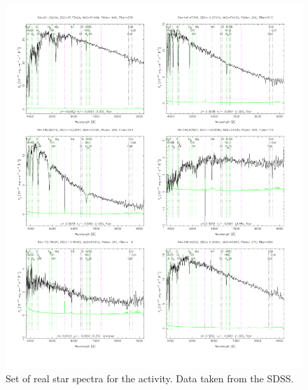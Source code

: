 \documentclass{tufte-handout}
\begin{document}
\begin{fullwidth}
\begin{figure}
  \includegraphics[width=2.0\columnwidth]{figures_activity4/spectra2.pdf}
  \caption{Set of real star spectra for the activity. Data taken from the SDSS.}
  \label{fig:spectra2}
\end{figure}


\end{fullwidth}
\end{document}
